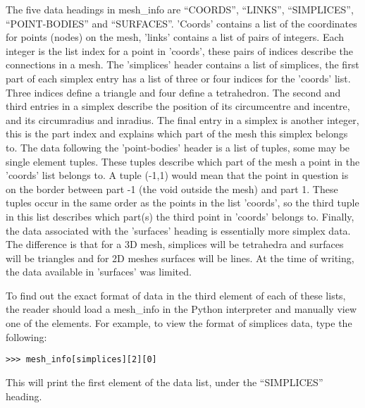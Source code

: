 The five data headings in {\ttfamily mesh\_info} are {\ttfamily ``COORDS''}, {\ttfamily ``LINKS''}, {\ttfamily ``SIMPLICES''}, {\ttfamily ``POINT-BODIES''} and {\ttfamily ``SURFACES''}.  'Coords' contains a list of the coordinates for points (nodes) on the mesh, 'links' contains a list of pairs of integers. Each integer is the list index for a point in 'coords', these pairs of indices describe the connections in a mesh. The 'simplices' header contains a list of simplices, the first part of each simplex entry has a list of three or four indices for the 'coords' list. Three indices define a triangle and four define a tetrahedron. The second and third entries in a simplex describe the position of its circumcentre and incentre, and its circumradius and inradius. The final entry in a simplex is another integer, this is the part index and explains which part of the mesh this simplex belongs to. The data following the 'point-bodies' header is a list of tuples, some may be single element tuples. These tuples describe which part of the mesh a point in the 'coords' list belongs to. A tuple {\ttfamily (-1,1)} would mean that the point in question is on the border between part -1 (the void outside the mesh) and part 1. These tuples occur in the same order as the points in the list 'coords', so the third tuple in this list describes which part(s) the third point in 'coords' belongs to. Finally, the data associated with the 'surfaces' heading is essentially more simplex data. The difference is that for a 3D mesh, simplices will be tetrahedra and surfaces will be triangles and for 2D meshes surfaces will be lines. At the time of writing, the data available in 'surfaces' was limited.

To find out the exact format of data in the third element of each of these lists, the reader should load a {\ttfamily mesh\_info} in the Python interpreter and manually view one of the elements. For example, to view the format of simplices data, type the following:
\begin{lstlisting}
>>> mesh_info[simplices][2][0]
\end{lstlisting}
This will print the first element of the data list, under the {\ttfamily ``SIMPLICES''} heading.



